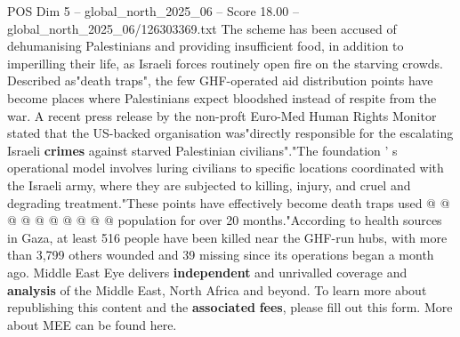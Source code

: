 \begin{textsample}{POS Dim 5 – global\_north\_2025\_06 – Score 18.00 – global\_north\_2025\_06/126303369.txt}
The scheme has been accused of dehumanising Palestinians and providing insufficient food, in addition to imperilling their life, as Israeli forces routinely open fire on the starving crowds.
Described as"death traps", the few GHF-operated aid distribution points have become places where Palestinians expect bloodshed instead of respite from the war.
A recent press release by the non-proft Euro-Med Human Rights Monitor stated that the US-backed organisation was"directly responsible for the escalating Israeli \textbf{crimes} against starved Palestinian civilians"."The foundation ' s operational model involves luring civilians to specific locations coordinated with the Israeli army, where they are subjected to killing, injury, and cruel and degrading treatment."These points have effectively become death traps used @ @ @ @ @ @ @ @ @ @ population for over 20 months."According to health sources in Gaza, at least 516 people have been killed near the GHF-run hubs, with more than 3,799 others wounded and 39 missing since its operations began a month ago.
Middle East Eye delivers \textbf{independent} and unrivalled coverage and \textbf{analysis} of the Middle East, North Africa and beyond.
To learn more about republishing this content and the \textbf{associated} \textbf{fees}, please fill out this form.
More about MEE can be found here.

\end{textsample}
